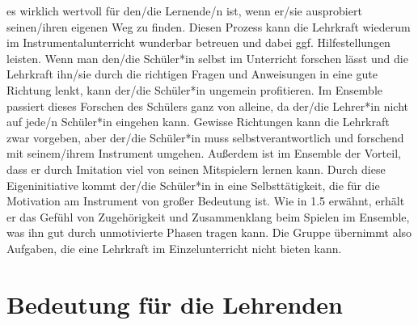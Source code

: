 es wirklich wertvoll für den/die Lernende/n ist, wenn er/sie ausprobiert
seinen/ihren eigenen Weg zu finden. Diesen Prozess kann die Lehrkraft wiederum
im Instrumentalunterricht wunderbar betreuen und dabei ggf. Hilfestellungen
leisten. Wenn man den/die Schüler*in selbst im Unterricht forschen lässt und die
Lehrkraft ihn/sie durch die richtigen Fragen und Anweisungen in eine gute
Richtung lenkt, kann der/die Schüler*in ungemein profitieren. Im Ensemble
passiert dieses Forschen des Schülers ganz von alleine, da der/die Lehrer*in
nicht auf jede/n Schüler*in eingehen kann. Gewisse Richtungen kann die Lehrkraft
zwar vorgeben, aber der/die Schüler*in muss selbstverantwortlich und forschend
mit seinem/ihrem Instrument umgehen. Außerdem ist im Ensemble der Vorteil, dass
er durch Imitation viel von seinen Mitspielern lernen kann. Durch diese
Eigeninitiative kommt der/die Schüler*in in eine Selbsttätigkeit, die für die
Motivation am Instrument von großer Bedeutung ist. Wie in 1.5 erwähnt, erhält er das Gefühl
von Zugehörigkeit und Zusammenklang beim Spielen im Ensemble, was ihn gut durch
unmotivierte Phasen tragen kann. Die Gruppe übernimmt also Aufgaben, die eine
Lehrkraft im Einzelunterricht nicht bieten kann.



\section{Bedeutung für die Lehrenden}

